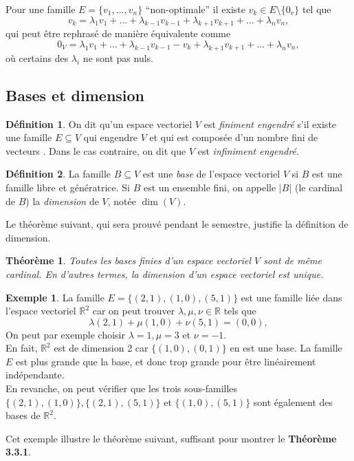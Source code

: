 \documentclass[oneside,12pt,french,table]{book}
\newcommand{\R}{\mathbb{R}}
\newtheorem{theorem}{Théorème}[section]
\theoremstyle{definition}
\theoremstyle{definition}
\newtheorem*{example}{Exemple}
\theoremstyle{definition}
\newtheorem{definition}{Définition}[chapter]
\begin{document}
    Pour une famille $E = \{ v_1,...,v_n \}$ ``non-optimale'' il existe $v_k\in E \setminus \{0_v\}$ tel que
    $$
       v_k = \lambda_1v_1 + \dots + \lambda_{k-1}v_{k-1}+  \lambda_{k+1}v_{k+1}+\dots+\lambda_nv_n,
    $$
    qui peut être rephrasé de manière équivalente comme
    $$
        0_V=\lambda_1v_1 + \dots + \lambda_{k-1}v_{k-1} - v_k +  \lambda_{k+1}v_{k+1}+\dots+\lambda_nv_n,
    $$ où certains des $\lambda_i$ ne sont pas nuls.
\subsection{Bases et dimension}
    \begin{definition}
        On dit qu'un espace vectoriel $V$ est \textit{finiment engendré} s'il existe une famille $E \subseteq V$ qui engendre $V$ et qui est composée d'un nombre fini de vecteurs . Dans le cas contraire, on dit que $V$ est \textit{infiniment engendré}.
    \end{definition}
    \begin{definition}
        La famille $B \subseteq V$ est une \textit{base} de l'espace vectoriel $V$ si $B$ est une famille libre et génératrice. Si $B$ est un ensemble fini, on appelle $\vert B \vert$ (le cardinal de $B$) la \textit{dimension} de $V$, notée $\dim(V)$.
    \end{definition}
\noindent
Le théorème suivant, qui sera prouvé pendant le semestre, justifie la définition de dimension.
\begin{theorem}
    Toutes les bases finies d'un espace vectoriel $V$ sont de même cardinal. En d'autres termes, la dimension d'un espace vectoriel est unique.
\end{theorem}
\begin{example} La famille $E=\{(2,1),(1,0),(5,1)\}$ est une famille liée dans l'espace vectoriel $\mathbb{R}^{2}$ car on peut trouver $\lambda, \mu, \nu \in \mathbb{R}$ tels que
$$
\lambda(2,1)+\mu(1,0)+\nu(5,1)=(0,0),
$$
On peut par exemple choisir $\lambda=1, \mu=3$ et $\nu=-1$. \\ En fait, $\R^2$ est de dimension 2 car $\{ (1,0),(0,1) \}$ en est une base. La famille $E$ est plus grande que la base, et donc trop grande pour être linéairement indépendante. \\
En revanche, on peut vérifier que les trois sous-familles $\{(2,1),(1,0)\},\{(2,1),(5,1)\}$ et $\{(1,0),(5,1)\}$ sont également des bases de $\mathbb{R}^{2}$.
\end{example}
\noindent
Cet exemple illustre le théorème suivant, suffisant pour montrer le \textbf{Théorème 3.3.1}.
\end{document}
